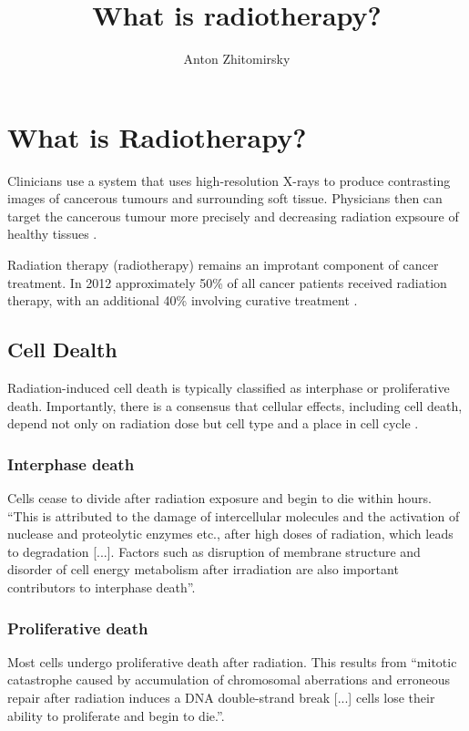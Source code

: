 \documentclass[11pt]{article}
\title{What is radiotherapy?}
\author{Anton Zhitomirsky}
\begin{document}
\maketitle

\section{What is Radiotherapy?}

Clinicians use a system that uses high-resolution X-rays to produce contrasting images of cancerous tumours and surrounding soft tissue. Physicians then can target the cancerous tumour more precisely and decreasing radiation expsoure of healthy tissues \cite{radiotherapy-basic-concepts}.

Radiation therapy (radiotherapy) remains an improtant component of cancer treatment. In 2012 approximately 50\% of all cancer patients received radiation therapy, with an additional 40\% involving curative treatment \cite{radiotherapy-advances}.

\subsection{Cell Dealth}

Radiation-induced cell death is typically classified as interphase or proliferative death. Importantly, there is a consensus that cellular effects, including cell death, depend not only on radiation dose but cell type and a place in cell cycle \cite{cell-death}.

\subsubsection{Interphase death}

Cells cease to divide after radiation exposure and begin to die within hours. ``This is attributed to the damage of intercellular molecules and the activation of nuclease and proteolytic enzymes etc., after high doses of radiation, which leads to degradation [...]. Factors such as disruption of membrane structure and disorder of cell energy metabolism after irradiation are also important contributors to interphase death''\cite{cell-death}.

\subsubsection{Proliferative death}

Most cells undergo proliferative death after radiation. This results from ``mitotic catastrophe caused by accumulation of chromosomal aberrations and erroneous repair after radiation induces a DNA double-strand break [...] cells lose their ability to proliferate and begin to die.''\cite{cell-death}.
\end{document}
